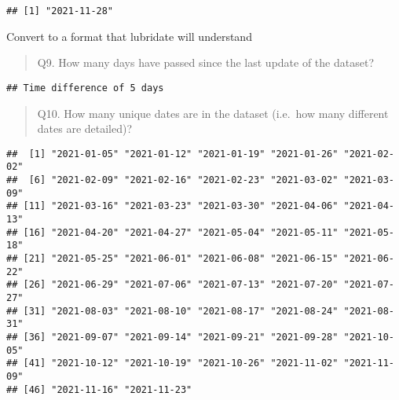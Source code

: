\documentclass[
]{article}
\newenvironment{Shaded}{\begin{snugshade}}{\end{snugshade}}
\newcommand{\FunctionTok}[1]{\textcolor[rgb]{0.00,0.00,0.00}{#1}}
\newcommand{\NormalTok}[1]{#1}
\newcommand{\OtherTok}[1]{\textcolor[rgb]{0.56,0.35,0.01}{#1}}
\newcommand{\SpecialCharTok}[1]{\textcolor[rgb]{0.00,0.00,0.00}{#1}}
\begin{document}
\begin{verbatim}
## [1] "2021-11-28"
\end{verbatim}

Convert to a format that lubridate will understand

\begin{Shaded}
\end{Shaded}

\begin{quote}
Q9. How many days have passed since the last update of the dataset?
\end{quote}

\begin{Shaded}
\end{Shaded}

\begin{verbatim}
## Time difference of 5 days
\end{verbatim}

\begin{quote}
Q10. How many unique dates are in the dataset (i.e.~how many different
dates are detailed)?
\end{quote}

\begin{Shaded}
\end{Shaded}

\begin{verbatim}
##  [1] "2021-01-05" "2021-01-12" "2021-01-19" "2021-01-26" "2021-02-02"
##  [6] "2021-02-09" "2021-02-16" "2021-02-23" "2021-03-02" "2021-03-09"
## [11] "2021-03-16" "2021-03-23" "2021-03-30" "2021-04-06" "2021-04-13"
## [16] "2021-04-20" "2021-04-27" "2021-05-04" "2021-05-11" "2021-05-18"
## [21] "2021-05-25" "2021-06-01" "2021-06-08" "2021-06-15" "2021-06-22"
## [26] "2021-06-29" "2021-07-06" "2021-07-13" "2021-07-20" "2021-07-27"
## [31] "2021-08-03" "2021-08-10" "2021-08-17" "2021-08-24" "2021-08-31"
## [36] "2021-09-07" "2021-09-14" "2021-09-21" "2021-09-28" "2021-10-05"
## [41] "2021-10-12" "2021-10-19" "2021-10-26" "2021-11-02" "2021-11-09"
## [46] "2021-11-16" "2021-11-23"
\end{verbatim}
\end{document}
